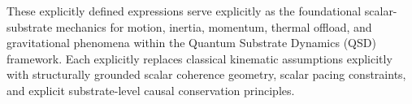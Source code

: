 \documentclass[preprints,article,submit,pdftex,moreauthors]{Definitions/mdpi}
\begin{document}
\vspace{1em}

These explicitly defined expressions serve explicitly as the foundational scalar-substrate mechanics for motion, inertia, momentum, thermal offload, and gravitational phenomena within the Quantum Substrate Dynamics (QSD) framework. Each explicitly replaces classical kinematic assumptions explicitly with structurally grounded scalar coherence geometry, scalar pacing constraints, and explicit substrate-level causal conservation principles.







\isPreprints{}{%
\begin{adjustwidth}{-\extralength}{0cm}
} %



% 
\end{document}
